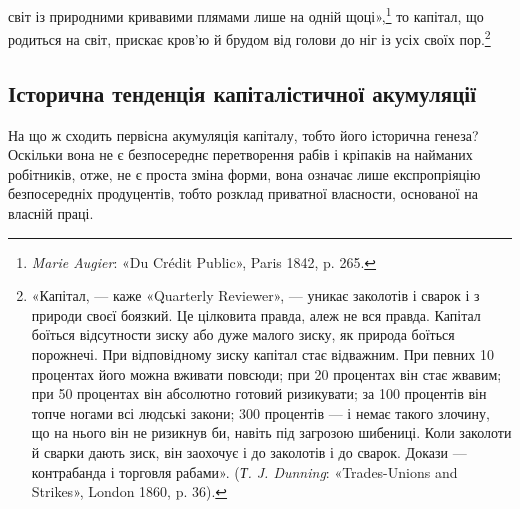 світ із природними кривавими плямами лише на одній щоці»,\footnote{
\emph{Marie Augier}: «Du Crédit Public», Paris 1842, p. 265.
}
то капітал, що родиться на світ, прискає кров’ю й брудом від
голови до ніг із усіх своїх пор.\footnote{
«Капітал, — каже «Quarterly Reviewer», — уникає заколотів
і сварок і з природи своєї боязкий. Це цілковита правда, алеж не вся
правда. Капітал боїться відсутности зиску або дуже малого зиску, як
природа боїться порожнечі. При відповідному зиску капітал стає відважним.
При певних 10 процентах його можна вживати повсюди; при 20 процентах
він стає жвавим; при 50 процентах він абсолютно готовий ризикувати;
за 100 процентів він топче ногами всі людські закони; 300 процентів
— і немає такого злочину, що на нього він не ризикнув би, навіть
під загрозою шибениці. Коли заколоти й сварки дають зиск, він заохочує
і до заколотів і до сварок. Докази — контрабанда і торговля рабами».
(\emph{Т. J. Dunning}: «Trades-Unions and Strikes», London 1860, p. 36).
}

\subsection{Історична тенденція капіталістичної акумуляції}

На що ж сходить первісна акумуляція капіталу, тобто його
історична генеза? Оскільки вона не є безпосереднє перетворення
рабів і кріпаків на найманих робітників, отже, не є проста
зміна форми, вона означає лише експропріяцію безпосередніх
продуцентів, тобто розклад приватної власности, основаної на
власній праці.
